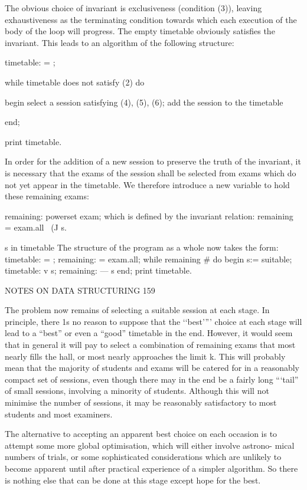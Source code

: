 The obvious choice of invariant is exclusiveness (condition (3)), leaving exhaustiveness as the terminating condition towards which each execution of the body of the loop will progress. The empty timetable obviously satisfies the invariant. This leads to an algorithm of the following structure:

timetable: = { };

while timetable does not satisfy (2) do

begin select a session satisfying (4), (5), (6); add the session to the timetable

end;

print timetable.

In order for the addition of a new session to preserve the truth of the invariant, it is necessary that the exams of the session shall be selected from exams which do not yet appear in the timetable. We therefore introduce a new variable to hold these remaining exams:

remaining: powerset exam; which is defined by the invariant relation: remaining = exam.all~ (J s.

s in timetable The structure of the program as a whole now takes the form: timetable: = { }; remaining: = exam.all; while remaining # { } do begin s:= suitable; timetable: v {s}; remaining: — s end; print timetable.

NOTES ON DATA STRUCTURING 159

The problem now remains of selecting a suitable session at each stage. In principle, there 1s no reason to suppose that the ‘‘best’”’ choice at each stage will lead to a “best” or even a “good” timetable in the end. However, it would seem that in general it will pay to select a combination of remaining exams that most nearly fills the hall, or most nearly approaches the limit k. This will probably mean that the majority of students and exams will be catered for in a reasonably compact set of sessions, even though there may in the end be a fairly long “‘tail” of small sessions, involving a minority of students. Although this will not minimise the number of sessions, it may be reasonably satisfactory to most students and most examiners.

The alternative to accepting an apparent best choice on each occasion is to attempt some more global optimisation, which will either involve astrono- mical numbers of trials, or some sophisticated considerations which are unlikely to become apparent until after practical experience of a simpler algorithm. So there is nothing else that can be done at this stage except hope for the best.

